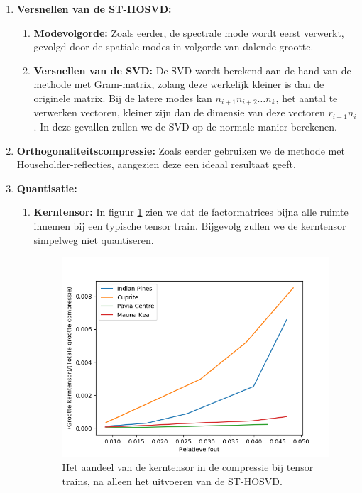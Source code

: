 \newpage
\begin{enumerate}
\item \textbf{Versnellen van de ST-HOSVD:}
\begin{enumerate}
\item \textbf{Modevolgorde:} Zoals eerder, de spectrale mode wordt eerst verwerkt, gevolgd door de spatiale modes in volgorde van dalende grootte.
\item \textbf{Versnellen van de SVD:} De SVD wordt berekend aan de hand van de methode met Gram-matrix, zolang deze werkelijk kleiner is dan de originele matrix. Bij de latere modes kan $n_{i+1} n_{i+2} \dots n_k$, het aantal te verwerken vectoren, kleiner zijn dan de dimensie van deze vectoren $r_{i-1} n_i$. In deze gevallen zullen we de SVD op de normale manier berekenen.
\end{enumerate}
\item \textbf{Orthogonaliteitscompressie:} Zoals eerder gebruiken we de methode met Householder-reflecties, aangezien deze een ideaal resultaat geeft.

\newpage
\item \textbf{Quantisatie:}
\begin{enumerate}

\item \textbf{Kerntensor:} In figuur \ref{fig:tensor-trains-core-tensor-size} zien we dat de factormatrices bijna alle ruimte innemen bij een typische tensor train. Bijgevolg zullen we de kerntensor simpelweg niet quantiseren.

\begin{figure}[]
  \centering
  \includegraphics[scale=0.7]{images/tensor_trains_core_tensor_size.png}
  \caption{Het aandeel van de kerntensor in de compressie bij tensor trains, na alleen het uitvoeren van de ST-HOSVD.}
\label{fig:tensor-trains-core-tensor-size}
\end{figure}


\end{enumerate}
\end{enumerate}

